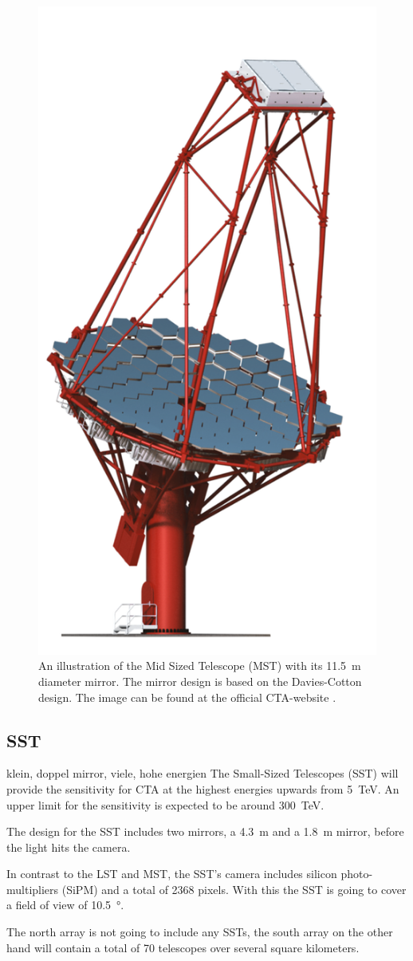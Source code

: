 \begin{figure}
	\center
	\includegraphics[width=.5\textwidth]{images/MST-1.png}
	\caption{An illustration of the Mid Sized Telescope (MST) with its
	\SI{11.5}{\meter} diameter mirror.
	The mirror design is based on the Davies-Cotton design.
	The image can be found at the official CTA-website \cite{cta_web}.}
	\label{fig:mst}
\end{figure}

\subsection{SST}
klein, doppel mirror, viele, hohe energien
The Small-Sized Telescopes (SST) will provide the sensitivity for CTA at the 
highest energies upwards from \SI{5}{\tera\electronvolt}.
An upper limit for the sensitivity is expected to be around \SI{300}{\tera\electronvolt}.

The design for the SST includes two mirrors, a \SI{4.3}{\meter} and a \SI{1.8}{\meter}
mirror, before the light hits the camera.

In contrast to the LST and MST, the SST's camera includes silicon photo-multipliers
(SiPM) and a total of 2368 pixels. With this the SST is going to cover a field of view 
of \SI{10.5}{\degree}.

The north array is not going to include any SSTs, the 
south array on the other hand will contain a total of 70 telescopes over
several square kilometers.

